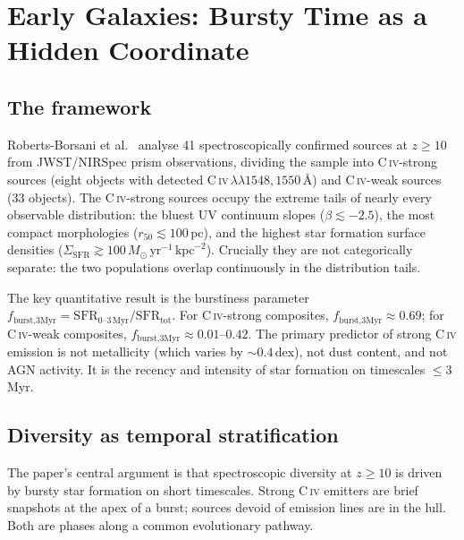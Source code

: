 \documentclass[12pt, oneside]{article}
\begin{document}
\section{Early Galaxies: Bursty Time as a Hidden Coordinate}

\subsection{The framework}

Roberts-Borsani et al.~\cite{roberts2026} analyse 41 spectroscopically confirmed sources at $z \geq 10$ from JWST/NIRSpec prism observations, dividing the sample into C\,\textsc{iv}-strong sources (eight objects with detected C\,\textsc{iv}\,$\lambda\lambda 1548, 1550$\,\AA) and C\,\textsc{iv}-weak sources (33 objects). The C\,\textsc{iv}-strong sources occupy the extreme tails of nearly every observable distribution: the bluest UV continuum slopes ($\beta \lesssim -2.5$), the most compact morphologies ($r_{50} \lesssim 100$\,pc), and the highest star formation surface densities ($\Sigma_{\text{SFR}} \gtrsim 100\,M_\odot\,\text{yr}^{-1}\,\text{kpc}^{-2}$). Crucially they are not categorically separate: the two populations overlap continuously in the distribution tails.

The key quantitative result is the burstiness parameter $f_{\text{burst,3Myr}} = \text{SFR}_{0\text{--}3\,\text{Myr}}/\text{SFR}_{\text{tot}}$. For C\,\textsc{iv}-strong composites, $f_{\text{burst,3Myr}} \approx 0.69$; for C\,\textsc{iv}-weak composites, $f_{\text{burst,3Myr}} \approx 0.01$--$0.42$. The primary predictor of strong C\,\textsc{iv} emission is not metallicity (which varies by $\sim 0.4$\,dex), not dust content, and not AGN activity. It is the recency and intensity of star formation on timescales $\leq 3$\,Myr.

\subsection{Diversity as temporal stratification}

The paper's central argument is that spectroscopic diversity at $z \geq 10$ is driven by bursty star formation on short timescales. Strong C\,\textsc{iv} emitters are brief snapshots at the apex of a burst; sources devoid of emission lines are in the lull. Both are phases along a common evolutionary pathway.
\end{document}
